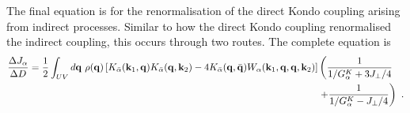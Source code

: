 The final equation is for the renormalisation of the direct Kondo coupling arising from indirect processes. Similar to how the direct Kondo coupling renormalised the indirect coupling, this occurs through two routes. The complete equation is
\begin{equation}\begin{aligned}
	\frac{\Delta J_{\alpha}}{\Delta D} = \frac{1}{2}\int_{UV} d{\bf q} ~\rho({\bf q}) \left[K_{\bar\alpha}({\bf k}_1, {\bf q})K_{\bar\alpha}({\bf q}, {\bf k}_2) - 4K_{\bar\alpha}({\bf q}, \bar {\bf q})W_{\alpha}({\bf k}_1, {\bf q},  {\bf q}, {\bf k}_2)\right]& \left(\frac{1}{1/ G_{\alpha}^K + 3J_\perp/4}\right.\\
&\left.+ \frac{1}{1/ G_{\alpha}^K - J_\perp/4}\right)~.
\end{aligned}\end{equation}


